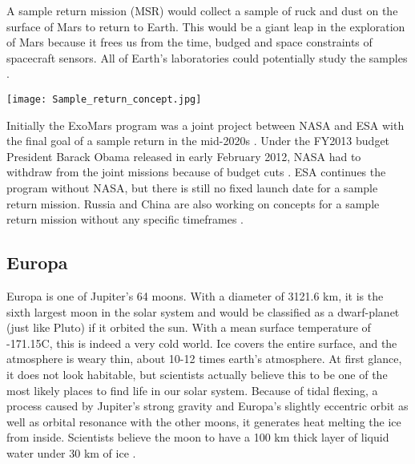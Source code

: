 \begin{multicols}{2}
A sample return mission (MSR) would collect a sample of ruck and dust on the surface of Mars to return to Earth.
This would be a giant leap in the exploration of Mars because it frees us from the time, budged and space constraints of spacecraft sensors.
All of Earth’s laboratories could potentially study the samples \cite{EarthAnalysis}.
 
\begin{center}
	\texttt{[image: Sample\_return\_concept.jpg]}
\end{center}

Initially the ExoMars program was a joint project between NASA and ESA with the final goal of a sample return in the mid-2020s \cite{FPlan15}.
Under the FY2013 budget President Barack Obama released in early February 2012, NASA had to withdraw from the joint missions because of budget cuts \cite{FPlan16}.
ESA continues the program without NASA, but there is still no fixed launch date for a sample return mission.
Russia and China are also working on concepts for a sample return mission without any specific timeframes \cite{RussiaPlan} \cite{ChinaPlan}.

\subsection*{Europa}


 
Europa is one of Jupiter's 64 moons.
With a diameter of 3121.6 km, it is the sixth largest moon in the solar system and would be classified as a dwarf-planet (just like Pluto) if it orbited the sun.
With a mean surface temperature of -171.15\degree C, this is indeed a very cold world.
Ice covers the entire surface, and the atmosphere is weary thin, about 10-12 times earth's atmosphere.
At first glance, it does not look habitable, but scientists actually believe this to be one of the most likely places to find life in our solar system.
Because of tidal flexing, a process caused by Jupiter’s strong gravity and Europa’s slightly eccentric orbit as well as orbital resonance with the other moons, it generates heat melting the ice from inside.
Scientists believe the moon to have a 100 km thick layer of liquid water under 30 km of ice \cite{FPlan03} \cite{FPlan24}.
 

\end{multicols}
